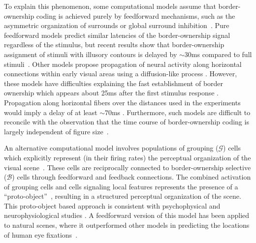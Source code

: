 To explain this phenomenon, some computational models assume that
border-ownership coding is achieved purely by feedforward mechanisms, such as the asymmetric organization of surrounds \citep{Nishimura_Sakai04,Nishimura_Sakai05,Sakai_etal12} or global surround inhibition~\citep{Super_etal10}. Pure feedforward models predict similar latencies of the border-ownership signal regardless of the stimulus, but recent results show that border-ownership assignment of stimuli with illusory contours is delayed by $\sim30$ms compared to full stimuli~\citep{Hesse_Tsao16}. Other models propose  propagation of neural activity along horizontal connections within early visual
areas using a diffusion-like process \citep{Grossberg94,Sajda_Finkel95,
Baek_Sajda05, Kikuchi_Akashi01, Pao_etal99,Zhaoping05,Zucker12}. However, these models have difficulties explaining the fast establishment of border ownership which appears about 25ms after
the first stimulus response \citep{Zhou_etal00}.  Propagation along horizontal fibers over the distances used in the experiments would imply a delay of at least $\sim70$ms \citep[][based on the conduction velocity of horizontal fibers in primate V1 cortex; we are not aware of corresponding data for V2]{Girard_etal01}. Furthermore, such models are difficult to reconcile with the observation that the time course of border-ownership coding is largely independent of figure
size~\citep{Sugihara_etal11}.

An alternative computational model involves populations of grouping
($\mathcal{G}$) cells which explicitly represent (in their firing rates) the perceptual organization of the visual scene~\citep{Craft_etal07,Mihalas_etal11b}. These cells are reciprocally connected to border-ownership selective ($\mathcal{B}$) cells through feedforward and feedback connections. The combined activation of grouping cells and cells signaling local features represents the presence of a ``proto-object''~\citep[we borrow this term from the perception literature;][]{Rensink00a}, resulting in a structured perceptual organization of the scene. This proto-object based approach is consistent with psychophysical and neurophysiological studies
\citep[\eg][]{Duncan84,Egly_etal94,Scholl01,Kimchi_etal07,Qiu_etal07,Ho_Yeh09,Poort_etal12}. A feedforward version of this model has been applied to natural scenes, where it outperformed other models in predicting the locations of human eye fixations~\citep{Russell_etal14}.

